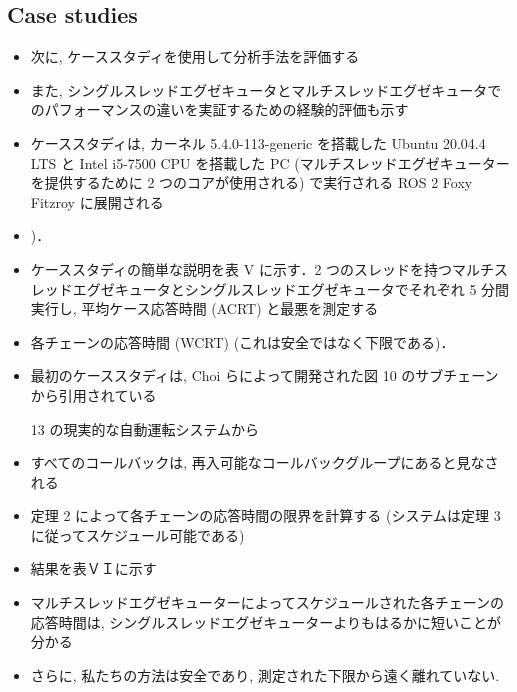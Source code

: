 \subsection{Case studies}
\label{ssec: case studies}

\begin{frame}{}
    \begin{itemize}
        \item 次に, ケーススタディを使用して分析手法を評価する
\item また, シングルスレッドエグゼキュータとマルチスレッドエグゼキュータでのパフォーマンスの違いを実証するための経験的評価も示す
\item ケーススタディは, カーネル 5.4.0-113-generic を搭載した Ubuntu 20.04.4 LTS と Intel i5-7500 CPU を搭載した PC (マルチスレッドエグゼキューターを提供するために 2 つのコアが使用される) で実行される ROS 2 Foxy Fitzroy に展開される
\item )．
    \end{itemize}
\end{frame}


\begin{frame}{}
    \begin{itemize}
        \item ケーススタディの簡単な説明を表 V に示す．2 つのスレッドを持つマルチスレッドエグゼキュータとシングルスレッドエグゼキュータでそれぞれ 5 分間実行し, 平均ケース応答時間 (ACRT) と最悪を測定する
\item 各チェーンの応答時間 (WCRT) (これは安全ではなく下限である)．
    \end{itemize}
\end{frame}

\begin{frame}{}
    \begin{itemize}
        \item 最初のケーススタディは, Choi らによって開発された図 10 のサブチェーンから引用されている
\item [13] の現実的な自動運転システムから
\item すべてのコールバックは, 再入可能なコールバックグループにあると見なされる
\item 定理 2 によって各チェーンの応答時間の限界を計算する (システムは定理 3 に従ってスケジュール可能である)
\item 結果を表ＶＩに示す
\item マルチスレッドエグゼキューターによってスケジュールされた各チェーンの応答時間は, シングルスレッドエグゼキューターよりもはるかに短いことが分かる
\item さらに, 私たちの方法は安全であり, 測定された下限から遠く離れていない.
    \end{itemize}
\end{frame}

